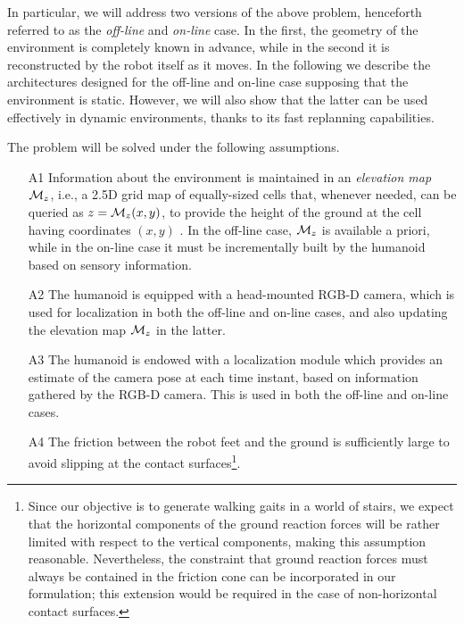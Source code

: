 In particular, we will address two versions of the above problem, henceforth referred to as the \textit{off-line} and \textit{on-line} case. In the first, the geometry of the environment is completely known in advance, while in the second it is reconstructed by the robot itself as it moves. 
In the following we describe the architectures designed for the off-line and on-line case supposing that the environment is static.
However, we will also show that the latter can be used effectively in dynamic environments, thanks to its fast replanning capabilities. 

The problem will be solved under the following assumptions.

\begin{itemize}

\item[A1] Information about the environment is maintained in an {\em elevation map} ${\cal M}_{z}$, i.e., a 2.5D grid map of equally-sized cells that, whenever needed, can be queried as $z = {\cal M}_{z}(x,y)$, to provide the height of the ground at the cell having coordinates $(x,y)$ \cite{Burgard2016WorldModeling}.
In the off-line case, ${\cal M}_{z}$ is available a priori, while in the on-line case it must be incrementally built by the humanoid based on sensory information. 
    
\item[A2] The humanoid is equipped with a head-mounted RGB-D camera, which is used for localization in both the off-line and on-line cases, and also updating the elevation map ${\cal M}_{z}$ in the latter.
    
\item[A3] The humanoid is endowed with a localization module which provides an estimate of the camera pose at each time instant, based on information gathered by the RGB-D camera. This is used in both the off-line and on-line cases.

\item[A4] The friction between the robot feet and the ground is sufficiently large to avoid slipping at the contact surfaces\footnote{Since our objective is to generate walking gaits in a world of stairs, we expect that the horizontal components of the ground reaction forces will be rather limited with respect to the vertical components, making this assumption reasonable. Nevertheless, the constraint that ground reaction forces must always be contained in the friction cone can be incorporated in our formulation; this extension would be required in the case of non-horizontal contact surfaces.}.

\end{itemize}

